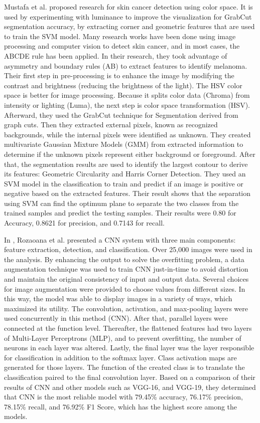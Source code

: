 \documentclass[12pt]{diazessay}
\begin{document}
    
    Mustafa et al. \cite{Mustafa2017-or} proposed research for skin cancer detection using color space. It is used by experimenting with luminance to improve the visualization for GrabCut segmentation accuracy, by extracting corner and geometric features that are used to train the SVM model. Many research works have been done using image processing and computer vision to detect skin cancer, and in most cases, the ABCDE rule has been applied. In their research, they took advantage of asymmetry and boundary rules (AB) to extract features to identify melanoma. Their first step in pre-processing is to enhance the image by modifying the contrast and brightness (reducing the brightness of the light). The HSV color space is better for image processing. Because it splits color data (Chroma) from intensity or lighting (Luma), the next step is color space transformation (HSV). Afterward, they used the GrabCut technique for Segmentation derived from graph cuts. Then they extracted external pixels, known as recognized backgrounds, while the internal pixels were identified as unknown. They created multivariate Gaussian Mixture Models (GMM) from extracted information to determine if the unknown pixels represent either background or foreground. After that, the segmentation results are used to identify the largest contour to derive its features: Geometric Circularity and Harris Corner Detection. They used an SVM model in the classification to train and predict if an image is positive or negative based on the extracted features. Their result shows that the separation using SVM can find the optimum plane to separate the two classes from the trained samples and predict the testing samples. Their results were 0.80 for Accuracy, 0.8621 for precision, and 0.7143 for recall.
    
    In \cite{Rezaoana2020-bt}, Rozaoana et al. presented a CNN system with three main components: feature extraction, detection, and classification. Over 25,000 images were used in the analysis. By enhancing the output to solve the overfitting problem, a data augmentation technique was used to train CNN just-in-time to avoid distortion and maintain the original consistency of input and output data. Several choices for image augmentation were provided to choose values from different sizes. In this way, the model was able to display images in a variety of ways, which maximized its utility. The convolution, activation, and max-pooling layers were used concurrently in this method (CNN). After that, parallel layers were connected at the function level. Thereafter, the flattened features had two layers of Multi-Layer Perceptrons (MLP), and to prevent overfitting, the number of neurons in each layer was altered. Lastly, the final layer was the layer responsible for classification in addition to the softmax layer. Class activation maps are generated for those layers. The function of the created class is to translate the classification paired to the final convolution layer. Based on a comparison of their results of CNN and other models such as VGG-16, and VGG-19, they determined that CNN is the most reliable model with 79.45\% accuracy, 76.17\% precision, 78.15\% recall, and 76.92\% F1 Score, which has the highest score among the models.
    
\end{document}
